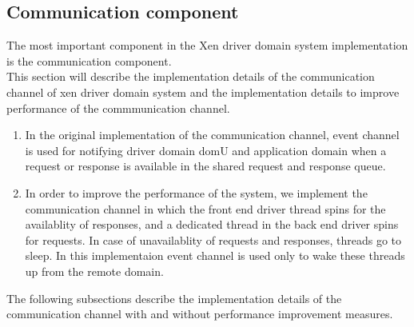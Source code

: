 \subsection{Communication component}
The most important component in the Xen driver domain system implementation is the communication component. 
\\
This section will describe the implementation details of the communication channel of xen driver domain system and the implementation details to improve performance of the commmunication channel.
\begin{enumerate}
\item In the original implementation of the communication channel, event channel is used for notifying driver domain domU and application domain when a request or response is available in the shared request and response queue.  
\item In order to improve the performance of the system, we implement the communication channel in which the front end driver thread spins for the availablity of responses, and a dedicated thread in the back end driver spins for requests. In case of unavailablity of requests and responses, threads go to sleep. In this implementaion event channel is used only to wake these threads up from the remote domain.
\end{enumerate}

The following subsections describe the implementation details of the communication channel with and without performance improvement measures.

